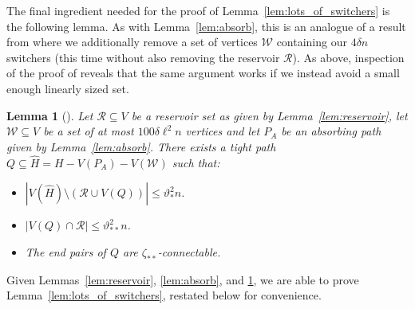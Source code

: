 \documentclass[A4paper,12pt]{article}
\newtheorem{lem}[thm]{Lemma}
\theoremstyle{definition}
\begin{document}
The final ingredient needed for the proof of Lemma~\ref{lem:lots_of_switchers} is the following lemma. As with Lemma~\ref{lem:absorb}, this is an analogue of a result from \cite{3hamcycle} where we additionally remove a set of vertices $\mathcal{W}$ containing our $4\delta n$ switchers (this time without also removing the reservoir $\mathcal{R}$). As above, inspection of the proof of \cite[Lemma~7.1]{3hamcycle} reveals that the same argument works if we instead avoid a small enough linearly sized set.


\begin{lem}[{\cite[Lemma~$7.1$]{3hamcycle}}]\label{lem:bigpath}
    Let $\mathcal{R} \subseteq V$ be a reservoir set as given by Lemma~\ref{lem:reservoir}, let $\mathcal{W} \subseteq V$ be a set of at most $100\delta \ell^2 n$ vertices and let $P_A$ be an absorbing path given by Lemma~\ref{lem:absorb}. There exists a tight path $Q \subseteq \hat{H} = H - V(P_A) - V(\mathcal{W})$ such that: 

    \begin{itemize}
        \item[(i)] $|V(\hat{H})\setminus (\mathcal{R} \cup V(Q))| \leq \vartheta_{*}^2 n$. 
        \item[(ii)] $|V(Q) \cap \mathcal{R}| \leq \vartheta_{**}^2 n$.
        \item[(iii)] The end pairs of $Q$ are $\zeta_{**}$-connectable.
    \end{itemize}
\end{lem}
Given Lemmas~\ref{lem:reservoir}, \ref{lem:absorb}, and \ref{lem:bigpath}, we are able to 
prove Lemma~\ref{lem:lots_of_switchers}, restated below for convenience.

\lotsofswitchers*
\end{document}
